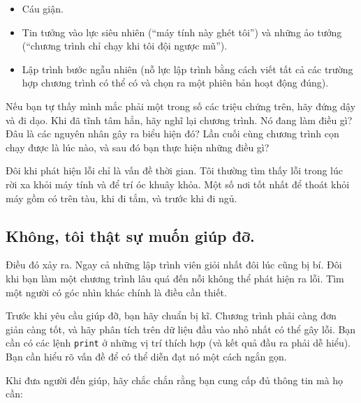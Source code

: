 \documentclass[11pt]{book}
\begin{document}
\begin{itemize}

\item Cáu giận.


\item Tin tưởng vào lực siêu nhiên (``máy tính này ghét tôi'') và
những ảo tưởng (``chương trình chỉ chạy khi tôi đội ngược mũ'').


\item Lập trình bước ngẫu nhiên (nỗ lực lập trình bằng cách viết
tất cả các trường hợp chương trình có thể có và chọn ra một 
phiên bản hoạt động đúng).


\end{itemize}

Nếu bạn tự thấy mình mắc phải một trong số các triệu chứng trên,
hãy đứng dậy và đi dạo. Khi đã tĩnh tâm hẳn, hãy nghĩ lại chương trình.
Nó đang làm điều gì? Đâu là các nguyên nhân gây ra biểu hiện đó?
Lần cuối cùng chương trình cọn chạy được là lúc nào, và sau đó
bạn thực hiện những điều gì?

Đôi khi phát hiện lỗi chỉ là vấn đề thời gian. Tôi thường tìm thấy lỗi
trong lúc rời xa khỏi máy tính và để trí óc khuây khỏa. Một số nơi
tốt nhất để thoát khỏi máy gồm có trên tàu, khi đi tắm, và
trước khi đi ngủ.


\subsection{Không, tôi thật sự muốn giúp đỡ.}

Điều đó xảy ra. Ngay cả những lập trình viên giỏi nhất đôi lúc
cũng bị bí. Đôi khi bạn làm một chương trình lâu quá đến nỗi
không thể phát hiện ra lỗi. Tìm một người có góc nhìn khác
chính là điều cần thiết.

Trước khi yêu cầu giúp đỡ, bạn hãy chuẩn bị kĩ. Chương trình
phải càng đơn giản càng tốt, và hãy phân tích trên dữ liệu
đầu vào nhỏ nhất có thể gây lỗi. Bạn cần có các lệnh {\tt print} 
ở những vị trí thích hợp (và kết quả đầu ra phải dễ hiểu).
Bạn cần hiểu rõ vấn đề để có thể diễn đạt nó một cách ngắn gọn.

Khi đưa người đến giúp, hãy chắc chắn rằng bạn cung cấp
đủ thông tin mà họ cần:
\end{document}
